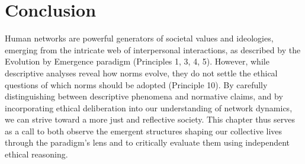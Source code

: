 \section{Conclusion}
Human networks are powerful generators of societal values and ideologies, emerging from the intricate web of interpersonal interactions, as described by the Evolution by Emergence paradigm (Principles 1, 3, 4, 5). However, while descriptive analyses reveal how norms evolve, they do not settle the ethical questions of which norms should be adopted (Principle 10). By carefully distinguishing between descriptive phenomena and normative claims, and by incorporating ethical deliberation into our understanding of network dynamics, we can strive toward a more just and reflective society. This chapter thus serves as a call to both observe the emergent structures shaping our collective lives through the paradigm's lens and to critically evaluate them using independent ethical reasoning. %
\cleardoublepage